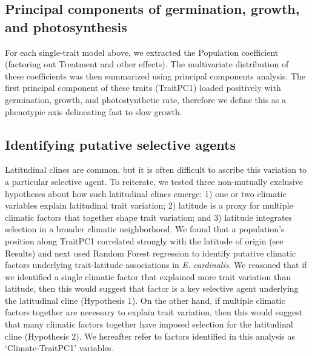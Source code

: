 \documentclass[11pt, oneside]{article}
\begin{document}
\subsection*{Principal components of germination, growth, and photosynthesis}
For each single-trait model above, we extracted the Population coefficient (factoring out Treatment and other effects). The multivariate distribution of these coefficients was then summarized using principal components analysis. The first principal component of these traits (TraitPC1) loaded positively with germination, growth, and photostynthetic rate, therefore we define this as a phenotypic axis delineating fast to slow growth.



\subsection*{Identifying putative selective agents}

Latitudinal clines are common, but it is often difficult to ascribe this variation to a particular selective agent. To reiterate, we tested three non-mutually exclusive hypotheses about how such latitudinal clines emerge: 1) one or two climatic variables explain latitudinal trait variation; 2) latitude is a proxy for multiple climatic factors that together shape trait variation; and 3) latitude integrates selection in a broader climatic neighborhood. We found that a population's position along TraitPC1 correlated strongly with the latitude of origin (see Results) and next used Random Forest regression \citep{Liaw_Wiener_2002} to identify putative climatic factors underlying trait-latitude associations in \textit{E. cardinalis}. We reasoned that if we identified a single climatic factor that explained more trait variation than latitude, then this would suggest that factor is a key selective agent underlying the latitudinal cline (Hypothesis 1). On the other hand, if multiple climatic factors together are necessary to explain trait variation, then this would suggest that many climatic factors together have imposed selection for the latitudinal cline (Hypothesis 2). We hereafter refer to factors identified in this analysis as `Climate-TraitPC1' variables. 
\end{document}
